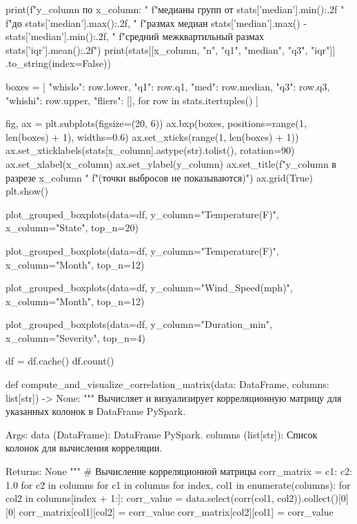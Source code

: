 \begin{code}
    print(f"{y_column} по {x_column}: "
          f"медианы групп от {stats['median'].min():.2f} "
          f"до {stats['median'].max():.2f}, "
          f"размах медиан {stats['median'].max() - stats['median'].min():.2f}, "
          f"средний межквартильный размах {stats['iqr'].mean():.2f}")
    print(stats[[x_column, "n", "q1", "median", "q3", "iqr"]]
          .to_string(index=False))

    boxes = [
        {
            "whislo": row.lower,
            "q1": row.q1,
            "med": row.median,
            "q3": row.q3,
            "whishi": row.upper,
            "fliers": [],
        }
        for row in stats.itertuples()
    ]

    fig, ax = plt.subplots(figsize=(20, 6))
    ax.bxp(boxes, positions=range(1, len(boxes) + 1), widths=0.6)
    ax.set_xticks(range(1, len(boxes) + 1))
    ax.set_xticklabels(stats[x_column].astype(str).tolist(), rotation=90)
    ax.set_xlabel(x_column)
    ax.set_ylabel(y_column)
    ax.set_title(f"{y_column} в разрезе {x_column} "
                 f"(точки выбросов не показываются)")
    ax.grid(True)
    plt.show()

plot_grouped_boxplots(data=df, y_column="Temperature(F)",
                      x_column="State", top_n=20)

plot_grouped_boxplots(data=df, y_column="Temperature(F)",
                      x_column="Month", top_n=12)

plot_grouped_boxplots(data=df, y_column="Wind_Speed(mph)",
                      x_column="Month", top_n=12)

plot_grouped_boxplots(data=df, y_column="Duration_min",
                      x_column="Severity", top_n=4)

df = df.cache()
df.count()

def compute_and_visualize_correlation_matrix(data: DataFrame,
                                             columns: list[str]) -> None:
    """
    Вычисляет и визуализирует корреляционную матрицу для указанных
    колонок в DataFrame PySpark.

    Args:
        data (DataFrame): DataFrame PySpark.
        columns (list[str]): Список колонок для вычисления корреляции.

    Returns:
        None
    """
    # Вычисление корреляционной матрицы
    corr_matrix = {c1: {c2: 1.0 for c2 in columns} for c1 in columns}
    for index, col1 in enumerate(columns):
        for col2 in columns[index + 1:]:
            corr_value = data.select(corr(col1, col2)).collect()[0][0]
            corr_matrix[col1][col2] = corr_value
            corr_matrix[col2][col1] = corr_value


\end{code}
